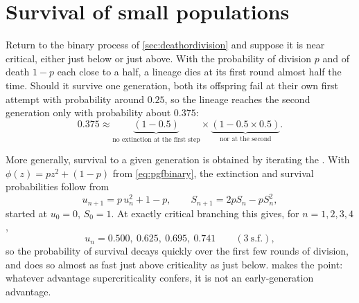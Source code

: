 \section{Survival of small populations}
\label{sec:small}

Return to the binary process of \cref{sec:deathordivision} and suppose it is near
critical, either just below or just above. With the probability of division $p$ and
of death $1-p$ each close to a half, a lineage dies at its first round almost half
the time. Should it survive one generation, both its offspring fail at their own
first attempt with probability around $0.25$, so the lineage reaches the second
generation only with probability about $0.375$:
\begin{equation*}
0.375 \approx
\underbrace{(1-0.5)}_{\text{no extinction at the first step}}\times
\underbrace{(1-0.5\times0.5)}_{\text{nor at the second}} .
\end{equation*}

More generally, survival to a given generation is obtained by iterating the \pgf{}.
With $\phi(z)=pz^2+(1-p)$ from \cref{eq:pgfbinary}, the extinction and survival
probabilities follow from
\begin{equation}
\label{eq:ext}
u_{n+1} = p\,u_n^2 + 1-p,
\qquad
S_{n+1} = 2pS_n - pS_n^2 ,
\end{equation}
started at $u_0=0$, $S_0=1$. At exactly critical branching this gives, for
$n=1,2,3,4$,
\begin{equation*}
u_n = 0.500,\ 0.625,\ 0.695,\ 0.741\qquad(3\ \text{s.f.}),
\end{equation*}
so the probability of survival decays quickly over the first few rounds of
division, and does so almost as fast just above criticality as just below.
 makes the point: whatever advantage supercriticality confers, it
is not an early-generation advantage.

